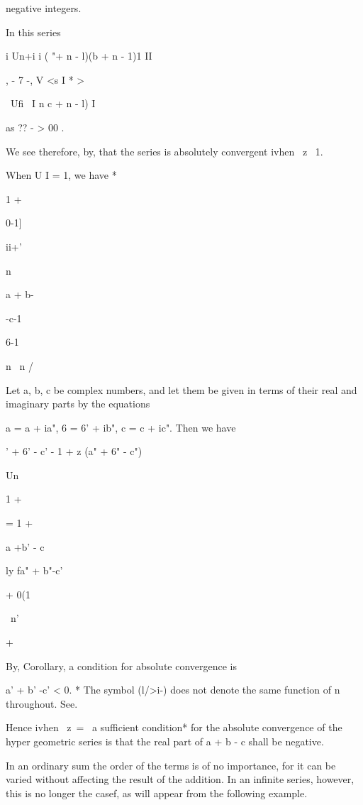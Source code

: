 negative integers.

  In this series

i Un+i i ( "+ n - l)(b + n - 1)1 II

, - 7 -, V <s I * >

\ Ufi \ I n c + n - l) I

as ?? - > 00 .

We see therefore, by, that the series is absolutely convergent
ivhen \ z\ < l, and divergent ivhen | | > 1.

When U I = 1, we have *

1 +

0-1]

ii+'

n

a + b-

-c-1

6-1

n \ n /

Let a, b, c be complex numbers, and let them be given in terms of
their real and imaginary parts by the equations

a = a + ia", 6 = 6' + ib", c = c + ic". Then we have

 ' + 6' - c' - 1 + z (a" + 6" - c")

Un

1 +

= 1 +

a +b' - c

ly fa" + b"-c'

+ 0(1

\ n'

+



By, Corollary, a condition for absolute convergence is

a' + b' -c' < 0. * The symbol (l/>i-) does not denote the same
function of n throughout. See.

%
%

Hence ivhen \ z\ = \, a sufficient condition* for the absolute
convergence of the hyper geometric series is that the real part of a +
b - c shall be negative.


In an ordinary sum the order of the terms is of no importance, for it
can be varied without affecting the result of the addition. In an
infinite series, however, this is no longer the casef, as will appear
from the following example.

